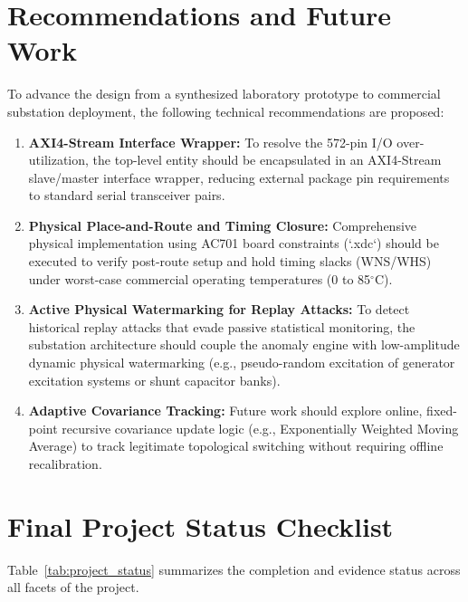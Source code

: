 \documentclass[12pt,a4paper]{report}
\begin{document}
\section{Recommendations and Future Work}
To advance the design from a synthesized laboratory prototype to commercial substation deployment,
the following technical recommendations are proposed:
\begin{enumerate}
    \item \textbf{AXI4-Stream Interface Wrapper:} To resolve the 572-pin I/O over-utilization,
    the top-level entity should be encapsulated in an AXI4-Stream slave/master interface wrapper,
    reducing external package pin requirements to standard serial transceiver pairs.
    \item \textbf{Physical Place-and-Route and Timing Closure:} Comprehensive physical implementation
    using AC701 board constraints (`.xdc`) should be executed to verify post-route setup and hold
    timing slacks (WNS/WHS) under worst-case commercial operating temperatures (0 to 85$^\circ$C).
    \item \textbf{Active Physical Watermarking for Replay Attacks:} To detect historical replay
    attacks that evade passive statistical monitoring, the substation architecture should
    couple the anomaly engine with low-amplitude dynamic physical watermarking (e.g., pseudo-random
    excitation of generator excitation systems or shunt capacitor banks).
    \item \textbf{Adaptive Covariance Tracking:} Future work should explore online, fixed-point
    recursive covariance update logic (e.g., Exponentially Weighted Moving Average) to track
    legitimate topological switching without requiring offline recalibration.
\end{enumerate}

\section{Final Project Status Checklist}
Table~\ref{tab:project_status} summarizes the completion and evidence status across all
facets of the project.
\end{document}
